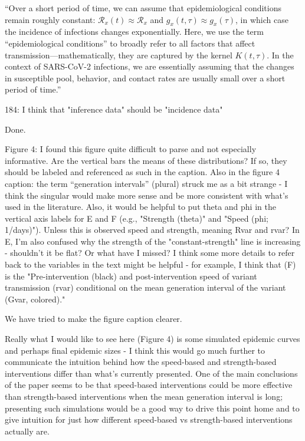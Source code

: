 \documentclass[12pt]{article}
\newcommand{\RR}{\ensuremath{{\mathcal R}}\xspace}
\newcommand{\revtext}{\textsf}
\begin{document}
``Over a short period of time, we can assume that epidemiological conditions remain roughly constant: $\RR_x(t) \approx \RR_x$ and $g_x(t, \tau) \approx g_x(\tau)$, in which case the incidence of infections changes exponentially.
Here, we use the term ``epidemiological conditions'' to broadly refer to all factors that affect transmission---mathematically, they are captured by the kernel $K(t, \tau)$.
In the context of SARS-CoV-2 infections, we are essentially assuming that the changes in susceptible pool, behavior, and contact rates are usually small over a short period of time.''

\revtext{184: I think that "inference data" should be "incidence data"}

Done.

\revtext{Figure 4: I found this figure quite difficult to parse and not especially informative. Are the vertical bars the means of these distributions? If so, they should be labeled and referenced as such in the caption. Also in the figure 4 caption: the term ``generation intervals'' (plural) struck me as a bit strange - I think the singular would make more sense and be more consistent with what's used in the literature. Also, it would be helpful to put theta and phi in the vertical axis labels for E and F (e.g., "Strength (theta)" and "Speed (phi; 1/days)"). Unless this is observed speed and strength, meaning Rvar and rvar? In E, I'm also confused why the strength of the "constant-strength" line is increasing - shouldn't it be flat? Or what have I missed? I think some more details to refer back to the variables in the text might be helpful - for example, I think that (F) is the "Pre-intervention (black) and post-intervention speed of variant transmission (rvar) conditional on the mean generation interval of the variant (Gvar, colored)."}

We have tried to make the figure caption clearer.

\revtext{Really what I would like to see here (Figure 4) is some simulated epidemic curves and perhaps final epidemic sizes - I think this would go much further to communicate the intuition behind how the speed-based and strength-based interventions differ than what's currently presented. One of the main conclusions of the paper seems to be that speed-based interventions could be more effective than strength-based interventions when the mean generation interval is long; presenting such simulations would be a good way to drive this point home and to give intuition for just how different speed-based vs strength-based interventions actually are.}
\end{document}

